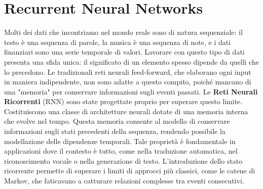 \chapter{Recurrent Neural Networks}
Molti dei dati che incontriamo nel mondo reale sono di natura sequenziale: il testo è una sequenza di parole, la musica è una sequenza di note, e i dati finanziari sono una serie temporale di valori. Lavorare con questo tipo di dati presenta una sfida unica: il significato di un elemento spesso dipende da quelli che lo precedono. Le tradizionali reti neurali feed-forward, che elaborano ogni input in maniera indipendente, non sono adatte a questo compito, poiché mancano di una "memoria" per conservare informazioni sugli eventi passati. Le \textbf{Reti Neurali Ricorrenti} (RNN) sono state progettate proprio per superare questo limite. Costituiscono una classe di architetture neurali dotate di una memoria interna che evolve nel tempo. Questa memoria consente al modello di conservare informazioni sugli stati precedenti della sequenza, rendendo possibile la modellazione delle dipendenze temporali. Tale proprietà è fondamentale in applicazioni dove il contesto è tutto, come nella traduzione automatica, nel riconoscimento vocale o nella generazione di testo. L'introduzione dello stato ricorrente permette di superare i limiti di approcci più classici, come le catene di Markov, che faticavano a catturare relazioni complesse tra eventi consecutivi.

